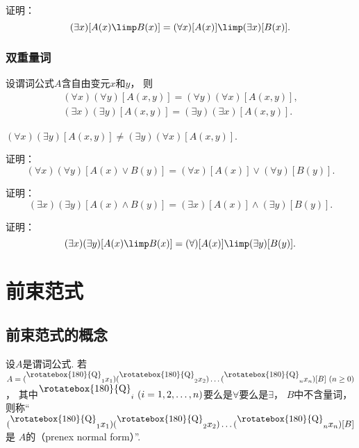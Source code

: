 \begin{example}
证明：\begin{equation}
	(\exists x)[A(x) \limp B(x)]
	= (\forall x)[A(x)] \limp (\exists x)[B(x)].
\end{equation}
\end{example}

\subsubsection{双重量词}
设谓词公式\(A\)含自由变元\(x\)和\(y\)，
则\begin{gather}
	(\forall x)(\forall y)[A(x,y)]
	= (\forall y)(\forall x)[A(x,y)], \\
	(\exists x)(\exists y)[A(x,y)]
	= (\exists y)(\exists x)[A(x,y)].
\end{gather}
\begin{remark}
\((\forall x)(\exists y)[A(x,y)]
\neq (\exists y)(\forall x)[A(x,y)]\).
\end{remark}

\begin{example}
证明：\begin{equation}
	(\forall x)(\forall y)[A(x) \lor B(y)]
	= (\forall x)[A(x)] \lor (\forall y)[B(y)].
\end{equation}
\end{example}

\begin{example}
证明：\begin{equation}
	(\exists x)(\exists y)[A(x) \land B(y)]
	= (\exists x)[A(x)] \land (\exists y)[B(y)].
\end{equation}
\end{example}

\begin{example}
证明：\begin{equation}
	(\exists x)(\exists y)[A(x) \limp B(x)]
	= (\forall)[A(x)] \limp (\exists y)[B(y)].
\end{equation}
\end{example}

\section{前束范式}
\subsection{前束范式的概念}
\begin{definition}
设\(A\)是谓词公式.
\def\Q{\raisebox{.6em}{\rotatebox{180}{Q}}}
若\(A = (\Q_1 x_1)(\Q_2 x_2)\dotso(\Q_n x_n)[B]\ (n\geq0)\)，
其中\(\Q_i\ (i=1,2,\dotsc,n)\)要么是\(\forall\)要么是\(\exists\)，
\(B\)中不含量词，
则称“\((\Q_1 x_1)(\Q_2 x_2)\dotso(\Q_n x_n)[B]\)是
\(A\)的（prenex normal form）”.
\end{definition}


